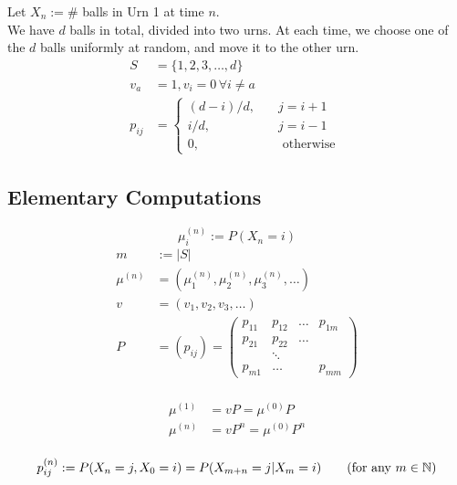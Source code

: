 \documentclass[11pt]{article}
\newcommand{\ur}[2]{{#1}^{({#2})}}
\newcommand{\dur}[3]{{#1}_{#2}^{({#3})}}
\begin{document}
    Let $X_n:= \#$ balls in Urn 1 at time $n$.\\
    We have $d$ balls in total, divided into two urns. At each time, we choose one of the $d$ balls uniformly at random, and move it to the other urn.\\ 
    \begin{align*}
    	S &= \{1, 2, 3, \hdots, d \}\\
    	v_{a} &= 1, v_i = 0 \, \forall i \neq a \\
    	p_{ij} &= \begin{cases}
    		(d - i) / d, \quad  &j = i + 1\\
    		i / d, \quad &j = i - 1 \\
    		0, \quad &\text{ otherwise }
    	\end{cases}
    \end{align*}
    
    \subsection{Elementary Computations}
    \notation
     $$\mu_i^{(n)} := P(X_n = i)$$ 
    \notation
    \begin{align*}
    	m &:= |S| \tag{the number of elements in S, could be infinity} \\
   		\mu^{(n)} &= (\mu_1^{(n)}, \mu_2^{(n)}, \mu_3^{(n)}, \hdots) \tag{$m \times 1$}\\
   		v &= (v_1, v_2, v_3, \hdots) \tag{$m \times 1$}\\
   		P &= (p_{ij}) = \begin{pmatrix}
   			p_{11} & p_{12} & \hdots & p_{1m}\\
   			p_{21} & p_{22} & \hdots & \\
   			& \ddots & &\\
   			p_{m1} & \hdots & & p_{mm}
   		\end{pmatrix} \tag{$m \times m$ matrix} \\
    \end{align*}
    
    \fact
    \begin{align*}
    	\mu^{(1)} &= vP = \ur{\mu}{0}P \\
    	\mu^{(n)} &= vP^n = \ur{\mu}{0}P^n \\
    \end{align*}
    
    \notation
    \begin{equation}
    	\dur{p}{ij}{n} := P(X_n = j, X_0 = i) = P(X_{m+n} = j | X_m = i) \tag{for any $m \in \mb{N}$}    	
    \end{equation}
    
\end{document}
